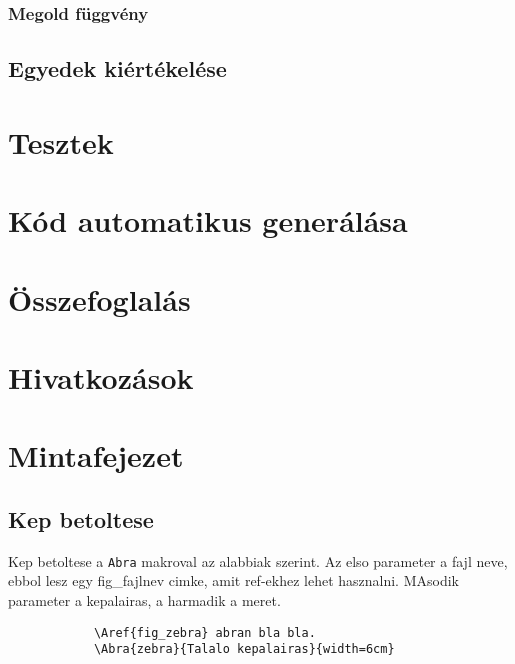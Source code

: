 \documentclass[12ppt,a4paper,oneside]{report}
\begin{document}
        \subsection{Megold függvény} %

    \section{Egyedek kiértékelése} %

\chapter{Tesztek} %

\chapter{Kód automatikus generálása} %

\chapter{Összefoglalás} %

\chapter*{Hivatkozások}

\appendix

\chapter{Mintafejezet}
    \section{Kep betoltese}
        Kep betoltese a \texttt{Abra} makroval az alabbiak szerint. Az elso parameter a fajl neve, ebbol lesz egy fig\_fajlnev cimke, amit ref-ekhez lehet hasznalni. MAsodik parameter a kepalairas, a harmadik a meret.
        \begin{verbatim}
            \Aref{fig_zebra} abran bla bla.
            \Abra{zebra}{Talalo kepalairas}{width=6cm}
        \end{verbatim}
\end{document}

